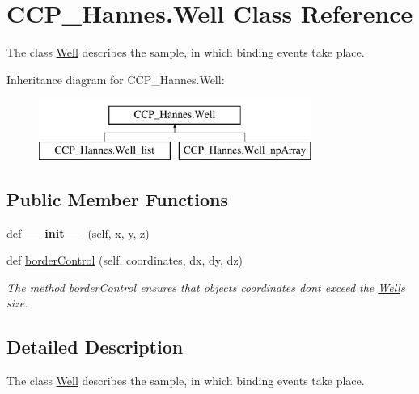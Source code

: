 \hypertarget{class_c_c_p___hannes_1_1_well}{}\section{C\+C\+P\+\_\+\+Hannes.\+Well Class Reference}
\label{class_c_c_p___hannes_1_1_well}


The class \mbox{\hyperlink{class_c_c_p___hannes_1_1_well}{Well}} describes the sample, in which binding events take place.  


Inheritance diagram for C\+C\+P\+\_\+\+Hannes.\+Well\+:\begin{figure}[H]
\begin{center}
\leavevmode
\includegraphics[height=2.000000cm]{class_c_c_p___hannes_1_1_well}
\end{center}
\end{figure}
\subsection*{Public Member Functions}
\begin{DoxyCompactItemize}
\item 
\mbox{\label{class_c_c_p___hannes_1_1_well_a3149734033aad29ad56cca89fd2b8580}} 
def {\bfseries \+\_\+\+\_\+init\+\_\+\+\_\+} (self, x, y, z)
\item 
def \mbox{\hyperlink{class_c_c_p___hannes_1_1_well_ae595041538a36438fa0ff796a1e24d4c}{border\+Control}} (self, coordinates, dx, dy, dz)
\begin{DoxyCompactList}\small\item\em The method border\+Control ensures that objects\textquotesingle{} coordinates don\textquotesingle{}t exceed the \mbox{\hyperlink{class_c_c_p___hannes_1_1_well}{Well}}\textquotesingle{}s size. \end{DoxyCompactList}\end{DoxyCompactItemize}


\subsection{Detailed Description}
The class \mbox{\hyperlink{class_c_c_p___hannes_1_1_well}{Well}} describes the sample, in which binding events take place. 


